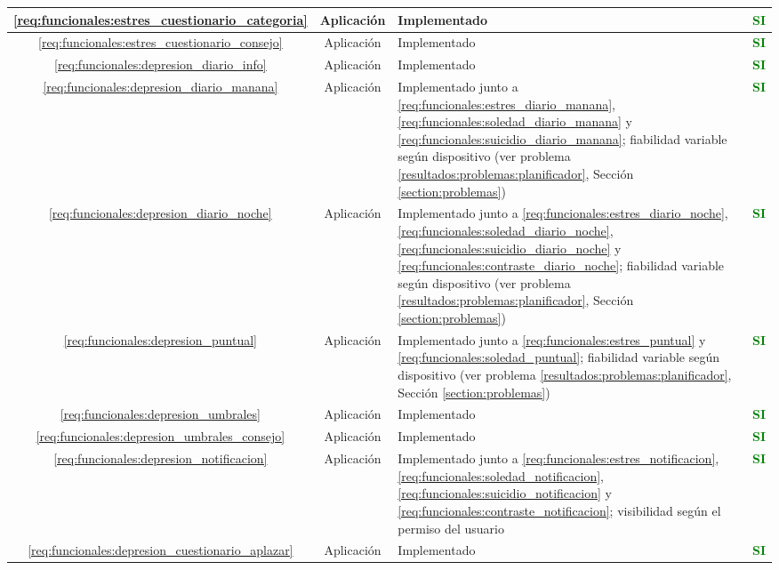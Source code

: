 \begin{xltabular}{\textwidth}{|c|c|X|c|}
        \hline
        \ref{req:funcionales:estres_cuestionario_categoria} & Aplicación & Implementado & \textcolor{green}{\textbf{SI}} \\
        \hline
        \ref{req:funcionales:estres_cuestionario_consejo} & Aplicación & Implementado & \textcolor{green}{\textbf{SI}} \\
        \hline
        \ref{req:funcionales:depresion_diario_info} & Aplicación & Implementado & \textcolor{green}{\textbf{SI}} \\
        \hline
        \ref{req:funcionales:depresion_diario_manana} & Aplicación & Implementado junto a \ref{req:funcionales:estres_diario_manana}, \ref{req:funcionales:soledad_diario_manana} y \ref{req:funcionales:suicidio_diario_manana}; fiabilidad variable según dispositivo (ver problema \ref{resultados:problemas:planificador}, Sección \ref{section:problemas}) & \textcolor{green}{\textbf{SI}} \\
        \hline
        \ref{req:funcionales:depresion_diario_noche} & Aplicación & Implementado junto a \ref{req:funcionales:estres_diario_noche}, \ref{req:funcionales:soledad_diario_noche}, \ref{req:funcionales:suicidio_diario_noche} y \ref{req:funcionales:contraste_diario_noche}; fiabilidad variable según dispositivo (ver problema \ref{resultados:problemas:planificador}, Sección \ref{section:problemas}) & \textcolor{green}{\textbf{SI}} \\
        \hline
        \ref{req:funcionales:depresion_puntual} & Aplicación & Implementado junto a \ref{req:funcionales:estres_puntual} y \ref{req:funcionales:soledad_puntual}; fiabilidad variable según dispositivo (ver problema \ref{resultados:problemas:planificador}, Sección \ref{section:problemas}) & \textcolor{green}{\textbf{SI}} \\
        \hline
        \ref{req:funcionales:depresion_umbrales} & Aplicación & Implementado & \textcolor{green}{\textbf{SI}} \\
        \hline
        \ref{req:funcionales:depresion_umbrales_consejo} & Aplicación & Implementado & \textcolor{green}{\textbf{SI}} \\
        \hline
        \ref{req:funcionales:depresion_notificacion} & Aplicación & Implementado junto a \ref{req:funcionales:estres_notificacion}, \ref{req:funcionales:soledad_notificacion}, \ref{req:funcionales:suicidio_notificacion} y \ref{req:funcionales:contraste_notificacion}; visibilidad según el permiso del usuario & \textcolor{green}{\textbf{SI}} \\
        \hline
        \ref{req:funcionales:depresion_cuestionario_aplazar} & Aplicación & Implementado & \textcolor{green}{\textbf{SI}} \\

\end{xltabular}

